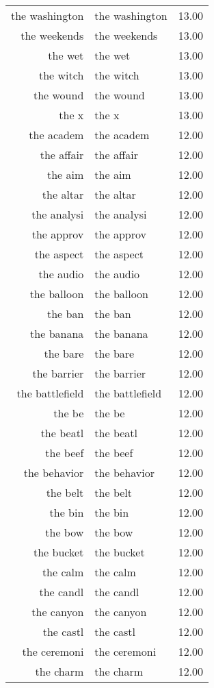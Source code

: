 \begin{table}[ht]
\begin{tabular}{rlr}
  the washington & the washington & 13.00 \\ 
  the weekends & the weekends & 13.00 \\ 
  the wet & the wet & 13.00 \\ 
  the witch & the witch & 13.00 \\ 
  the wound & the wound & 13.00 \\ 
  the x & the x & 13.00 \\ 
  the academ & the academ & 12.00 \\ 
  the affair & the affair & 12.00 \\ 
  the aim & the aim & 12.00 \\ 
  the altar & the altar & 12.00 \\ 
  the analysi & the analysi & 12.00 \\ 
  the approv & the approv & 12.00 \\ 
  the aspect & the aspect & 12.00 \\ 
  the audio & the audio & 12.00 \\ 
  the balloon & the balloon & 12.00 \\ 
  the ban & the ban & 12.00 \\ 
  the banana & the banana & 12.00 \\ 
  the bare & the bare & 12.00 \\ 
  the barrier & the barrier & 12.00 \\ 
  the battlefield & the battlefield & 12.00 \\ 
  the be & the be & 12.00 \\ 
  the beatl & the beatl & 12.00 \\ 
  the beef & the beef & 12.00 \\ 
  the behavior & the behavior & 12.00 \\ 
  the belt & the belt & 12.00 \\ 
  the bin & the bin & 12.00 \\ 
  the bow & the bow & 12.00 \\ 
  the bucket & the bucket & 12.00 \\ 
  the calm & the calm & 12.00 \\ 
  the candl & the candl & 12.00 \\ 
  the canyon & the canyon & 12.00 \\ 
  the castl & the castl & 12.00 \\ 
  the ceremoni & the ceremoni & 12.00 \\ 
  the charm & the charm & 12.00 \\ 

\end{tabular}
\end{table}
